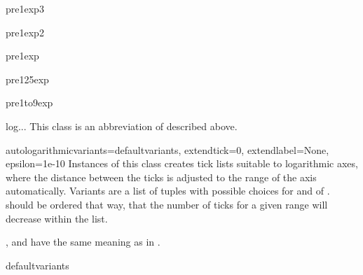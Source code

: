 \begin{memberdesc}{pre1exp3}
\end{memberdesc}

\begin{memberdesc}{pre1exp2}
\end{memberdesc}

\begin{memberdesc}{pre1exp}
\end{memberdesc}

\begin{memberdesc}{pre125exp}
\end{memberdesc}

\begin{memberdesc}{pre1to9exp}
\end{memberdesc}

\begin{classdesc}{log}{...}
This class is an abbreviation of  described above.
\end{classdesc}

\begin{classdesc}{autologarithmic}{variants=defaultvariants,
                                   extendtick=0, extendlabel=None,
                                   epsilon=1e-10}
  Instances of this class creates tick lists suitable to logarithmic
  axes, where the distance between the ticks is adjusted to the range
  of the axis automatically. Variants are a list of tuples with
  possible choices for  and  of
  .  should be ordered that way, that
  the number of ticks for a given range will decrease within the
   list.

  ,  and  have the same
  meaning as in .
\end{classdesc}

\begin{memberdesc}{defaultvariants}
\end{memberdesc}

